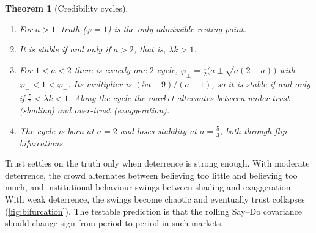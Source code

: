 \documentclass[11pt,a4paper]{article}
\theoremstyle{sci}
\newtheorem{theorem}{Theorem}[section]
\theoremstyle{scidef}
\begin{document}
\begin{theorem}[Credibility cycles]\label{thm:cycles}
\begin{enumerate}[label=(\roman*)]
  \item For $a>1$, truth ($\varphi=1$) is the only admissible resting point.
  \item It is stable if and only if $a>2$, that is, $\lambda k>1$.
  \item For $1<a<2$ there is exactly one $2$-cycle, $\varphi_\pm=\tfrac12\big(a\pm\sqrt{a(2-a)}\big)$ with $\varphi_-<1<\varphi_+$. Its multiplier is $(5a-9)/(a-1)$, so it is stable if and only if $\tfrac56<\lambda k<1$. Along the cycle the market alternates between under-trust (shading) and over-trust (exaggeration).
  \item The cycle is born at $a=2$ and loses stability at $a=\tfrac53$, both through flip bifurcations.
\end{enumerate}
\end{theorem}

\begin{inwords}
Trust settles on the truth only when deterrence is strong enough. With moderate deterrence, the crowd alternates between believing too little and believing too much, and institutional behaviour swings between shading and exaggeration. With weak deterrence, the swings become chaotic and eventually trust collapses (\cref{fig:bifurcation}). The testable prediction is that the rolling Say--Do covariance should change sign from period to period in such markets.
\end{inwords}
\end{document}
